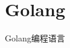 \documentclass{../main.tex}{subfiles}
\begin{document}
\chapter{Golang}

Golang编程语言

\end{document}
